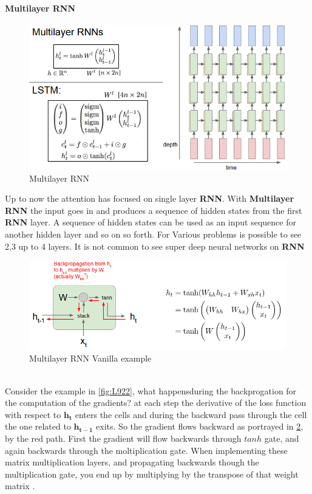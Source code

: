 \documentclass[11pt]{article}
\begin{document}
\paragraph{Multilayer RNN}
\begin{figure}[h]
\centering
\captionsetup{justification=centering}
\includegraphics[width=0.7\linewidth]{L920.pdf}
\caption{ Multilayer RNN}
\label{fig:L920}
\end{figure}
Up to now the attention has focused on single layer \textbf{RNN}. With \textbf{Multilayer RNN} the input goes in and produces a sequence of hidden states from the first \textbf{RNN} layer. A sequence of hidden states can be used as an input  sequence for another hidden layer and so on so forth. For Various problems is possible to see 2,3 up to 4 layers. It is not common to see super deep neural networks on \textbf{RNN}
\begin{figure}[h]
\centering
\captionsetup{justification=centering}
\includegraphics[width=0.9\linewidth]{L921.pdf}
\caption{ Multilayer RNN Vanilla example}
\label{fig:L921}
\end{figure}\\
Consider the example in \ref{fig:L922}, what happensduring the backprogation for the computation of the gradients? at each step  the derivative of the loss function with respect to $\mathbf{h_t}$ enters the cells  and during the backward pass through the cell the one related to $\mathbf{h_{t-1}}$ exits. So the gradient flows backward as portrayed in  \ref{fig:L921}, by the red path. First the gradient will flow backwards through $tanh$ gate, and again backwards through the moltiplication gate. When implementing these matrix multiplication layers, and propagating backwards though the multiplication gate, you end up by multiplying  by the transpose of that weight matrix .
\end{document}
